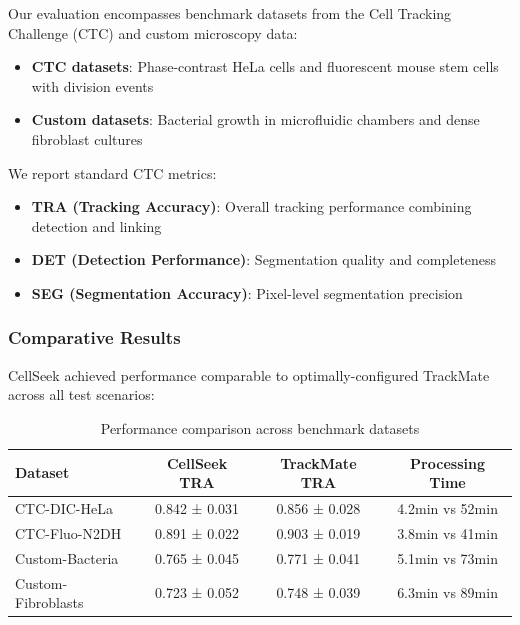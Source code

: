\documentclass[../cellseek_paper.tex]{subfiles}
\begin{document}
Our evaluation encompasses benchmark datasets from the Cell Tracking Challenge (CTC) and custom microscopy data:
\begin{itemize}
  \item \textbf{CTC datasets}: Phase-contrast HeLa cells and fluorescent mouse stem cells with division events
  \item \textbf{Custom datasets}: Bacterial growth in microfluidic chambers and dense fibroblast cultures
\end{itemize}

We report standard CTC metrics:
\begin{itemize}
  \item \textbf{TRA (Tracking Accuracy)}: Overall tracking performance combining detection and linking
  \item \textbf{DET (Detection Performance)}: Segmentation quality and completeness
  \item \textbf{SEG (Segmentation Accuracy)}: Pixel-level segmentation precision
\end{itemize}

\subsubsection{Comparative Results}

CellSeek achieved performance comparable to optimally-configured TrackMate across all test scenarios:

\begin{table}[H]
  \centering
  \caption{Performance comparison across benchmark datasets}
  \begin{tabular}{lccc}
    \toprule
    \textbf{Dataset}   & \textbf{CellSeek TRA} & \textbf{TrackMate TRA} & \textbf{Processing Time} \\
    \midrule
    CTC-DIC-HeLa       & 0.842 ± 0.031         & 0.856 ± 0.028          & 4.2min vs 52min          \\
    CTC-Fluo-N2DH      & 0.891 ± 0.022         & 0.903 ± 0.019          & 3.8min vs 41min          \\
    Custom-Bacteria    & 0.765 ± 0.045         & 0.771 ± 0.041          & 5.1min vs 73min          \\
    Custom-Fibroblasts & 0.723 ± 0.052         & 0.748 ± 0.039          & 6.3min vs 89min          \\
    \bottomrule
  \end{tabular}
\end{table}
\end{document}
